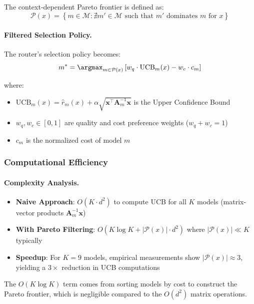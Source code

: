 The context-dependent Pareto frontier is defined as:
\begin{equation}
    \mathcal{P}(x) = \left\{ m \in \mathcal{M} : \nexists m' \in \mathcal{M} \text{ such that } m' \text{ dominates } m \text{ for } x \right\}
\end{equation}

\paragraph{Filtered Selection Policy.}
The router's selection policy becomes:
\begin{equation}
    m^* = \argmax_{m \in \mathcal{P}(x)} \left[ w_q \cdot \text{UCB}_m(x) - w_c \cdot c_m \right]
\end{equation}

where:
\begin{itemize}
    \item $\text{UCB}_m(x) = \hat{r}_m(x) + \alpha \sqrt{\mathbf{x}^\top \mathbf{A}_m^{-1} \mathbf{x}}$ is the Upper Confidence Bound
    \item $w_q, w_c \in [0,1]$ are quality and cost preference weights ($w_q + w_c = 1$)
    \item $c_m$ is the normalized cost of model $m$
\end{itemize}

\subsubsection{Computational Efficiency}

\paragraph{Complexity Analysis.}
\begin{itemize}
    \item \textbf{Naive Approach}: $O(K \cdot d^2)$ to compute UCB for all $K$ models (matrix-vector products $\mathbf{A}_m^{-1} \mathbf{x}$)
    \item \textbf{With Pareto Filtering}: $O(K \log K + |\mathcal{P}(x)| \cdot d^2)$ where $|\mathcal{P}(x)| \ll K$ typically
    \item \textbf{Speedup}: For $K=9$ models, empirical measurements show $|\mathcal{P}(x)| \approx 3$, yielding a $3\times$ reduction in UCB computations
\end{itemize}

The $O(K \log K)$ term comes from sorting models by cost to construct the Pareto frontier, which is negligible compared to the $O(d^2)$ matrix operations.


